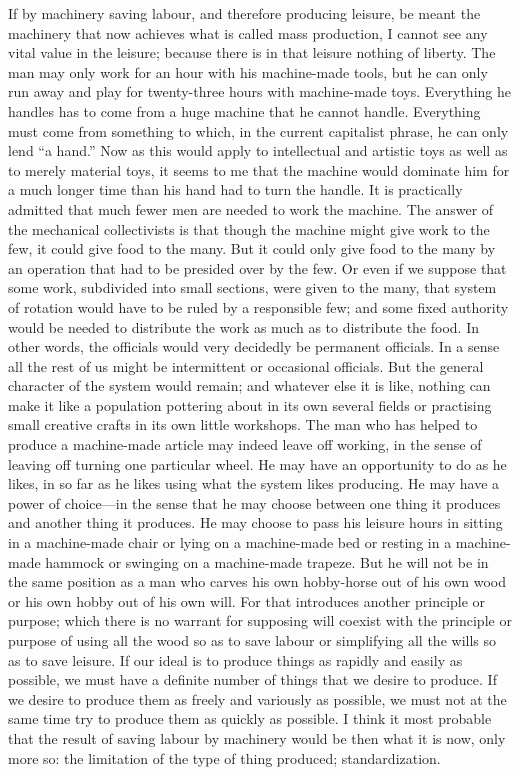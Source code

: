 \documentclass{book}
\begin{document}
If by machinery saving labour, and therefore producing leisure, be meant the machinery that now achieves what is called mass production, I cannot see any vital value in the leisure; because there is in that leisure nothing of liberty. The man may only work for an hour with his machine-made tools, but he can only run away and play for twenty-three hours with machine-made toys. Everything he handles has to come from a huge machine that he cannot handle. Everything must come from something to which, in the current capitalist phrase, he can only lend “a hand.” Now as this would apply to intellectual and artistic toys as well as to merely material toys, it seems to me that the machine would dominate him for a much longer time than his hand had to turn the handle. It is practically admitted that much fewer men are needed to work the machine. The answer of the mechanical collectivists is that though the machine might give work to the few, it could give food to the many. But it could only give food to the many by an operation that had to be presided over by the few. Or even if we suppose that some work, subdivided into small sections, were given to the many, that system of rotation would have to be ruled by a responsible few; and some fixed authority would be needed to distribute the work as much as to distribute the food. In other words, the officials would very decidedly be permanent officials. In a sense all the rest of us might be intermittent or occasional officials. But the general character of the system would remain; and whatever else it is like, nothing can make it like a population pottering about in its own several fields or practising small creative crafts in its own little workshops. The man who has helped to produce a machine-made article may indeed leave off working, in the sense of leaving off turning one particular wheel. He may have an opportunity to do as he likes, in so far as he likes using what the system likes producing. He may have a power of choice—in the sense that he may choose between one thing it produces and another thing it produces. He may choose to pass his leisure hours in sitting in a machine-made chair or lying on a machine-made bed or resting in a machine-made hammock or swinging on a machine-made trapeze. But he will not be in the same position as a man who carves his own hobby-horse out of his own wood or his own hobby out of his own will. For that introduces another principle or purpose; which there is no warrant for supposing will coexist with the principle or purpose of using all the wood so as to save labour or simplifying all the wills so as to save leisure. If our ideal is to produce things as rapidly and easily as possible, we must have a definite number of things that we desire to produce. If we desire to produce them as freely and variously as possible, we must not at the same time try to produce them as quickly as possible. I think it most probable that the result of saving labour by machinery would be then what it is now, only more so: the limitation of the type of thing produced; standardization.
\end{document}
